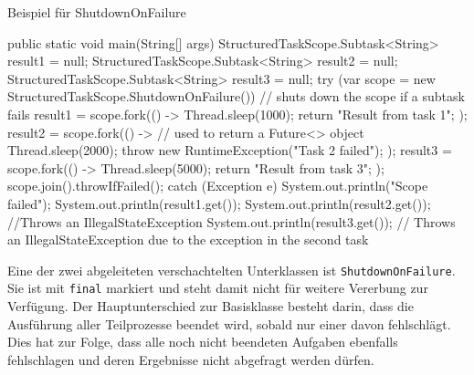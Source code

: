     \begin{program} [H]
        \caption{Beispiel für ShutdownOnFailure}
        \label{prog:BeispielFürShutdownOnFailure}
    \begin{JavaCode}[language=Java, numbers=left]
public static void main(String[] args) {
    StructuredTaskScope.Subtask<String> result1 = null;
    StructuredTaskScope.Subtask<String> result2 = null;
    StructuredTaskScope.Subtask<String> result3 = null;
    try (var scope = new StructuredTaskScope.ShutdownOnFailure()) {            // shuts down the scope if a subtask fails
        result1 = scope.fork(() -> {
            Thread.sleep(1000);
            return "Result from task 1";
        });
        result2 = scope.fork(() -> {         // used to return a Future<> object
            Thread.sleep(2000);
            throw new RuntimeException("Task 2 failed");
        });
        result3 = scope.fork(() -> {
            Thread.sleep(5000);
            return "Result from task 3";
        });
        scope.join().throwIfFailed();
    } catch (Exception e) {
        System.out.println("Scope failed");
    }
    System.out.println(result1.get());                                          
    System.out.println(result2.get());         //Throws an IllegalStateException
    System.out.println(result3.get());        // Throws an IllegalStateException due to the exception in the second task
}\end{JavaCode}
    \end{program}
    Eine der zwei abgeleiteten verschachtelten Unterklassen ist \texttt{ShutdownOnFailure}. Sie ist mit \texttt{final} markiert und steht damit nicht für weitere
    Vererbung zur Verfügung. Der Hauptunterschied zur Basisklasse besteht darin, dass die Ausführung aller Teilprozesse beendet wird, sobald nur einer davon fehlschlägt.
    Dies hat zur Folge, dass alle noch nicht beendeten Aufgaben ebenfalls fehlschlagen und deren Ergebnisse nicht abgefragt werden dürfen.

